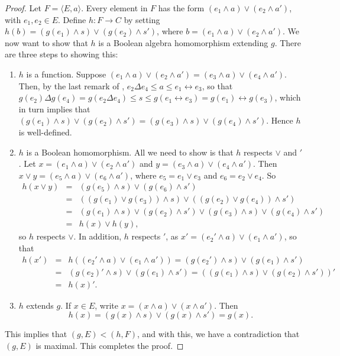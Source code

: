 \documentclass[12pt]{article}
\begin{document}
\begin{proof}
Let $F=\langle E,a\rangle$.  Every element in $F$ has the form $(e_1\wedge a)\vee (e_2\wedge a')$, with $e_1,e_2\in E$.  Define $h:F\to C$ by setting $h(b)=(g(e_1)\wedge s)\vee (g(e_2)\wedge s')$, where $b=(e_1\wedge a)\vee (e_2\wedge a')$.  We now want to show that $h$ is a Boolean algebra homomorphism extending $g$.  There are three steps to showing this:
\begin{enumerate}
\item $h$ is a function.  Suppose $(e_1\wedge a)\vee (e_2\wedge a')=(e_3\wedge a)\vee (e_4\wedge a')$.  Then, by the last remark of , $e_2\Delta e_4 \le a \le e_1\leftrightarrow e_3$, so that $g(e_2)\Delta g(e_4) = g(e_2\Delta e_4)\le s \le g(e_1\leftrightarrow e_3) = g(e_1)\leftrightarrow g(e_3)$, which in turn implies that $(g(e_1)\wedge s)\vee (g(e_2)\wedge s') = (g(e_3)\wedge s)\vee (g(e_4)\wedge s')$.  Hence $h$ is well-defined.
\item $h$ is a Boolean homomorphism.  All we need to show is that $h$ respects $\vee$ and $'$.  Let $x=(e_1\wedge a)\vee (e_2\wedge a')$ and $y = (e_3\wedge a)\vee (e_4\wedge a')$.  Then $x\vee y = (e_5\wedge a)\vee (e_6\wedge a')$, where $e_5=e_1\vee e_3$ and $e_6=e_2\vee e_4$.  So 
\begin{eqnarray*}
h(x\vee y) &=& (g(e_5)\wedge s)\vee (g(e_6)\wedge s') \\ 
&=& ((g(e_1)\vee g(e_3))\wedge s)\vee ((g(e_2)\vee g(e_4))\wedge s') \\ 
&=& (g(e_1)\wedge s)\vee (g(e_2)\wedge s') \vee (g(e_3)\wedge s)\vee (g(e_4)\wedge s') \\ 
&=& h(x)\vee h(y),
\end{eqnarray*}
so $h$ respects $\vee$.  In addition, $h$ respects $'$, as $x'= (e_2'\wedge a)\vee (e_1\wedge a')$, so that
\begin{eqnarray*}
h(x') &=& h((e_2'\wedge a)\vee (e_1\wedge a')) = (g(e_2')\wedge s)\vee (g(e_1)\wedge s') \\ 
&=& (g(e_2)'\wedge s)\vee (g(e_1)\wedge s') = ((g(e_1)\wedge s)\vee (g(e_2)\wedge s'))' \\ &=& h(x)'.
\end{eqnarray*}
\item $h$ extends $g$.  If $x\in E$, write $x=(x\wedge a)\vee (x\wedge a')$.  Then $$h(x)= (g(x)\wedge s)\vee (g(x)\wedge s') = g(x).$$
\end{enumerate}
This implies that $(g,E)< (h,F)$, and with this, we have a contradiction that $(g,E)$ is maximal.  This completes the proof.
\end{proof}
\end{document}
